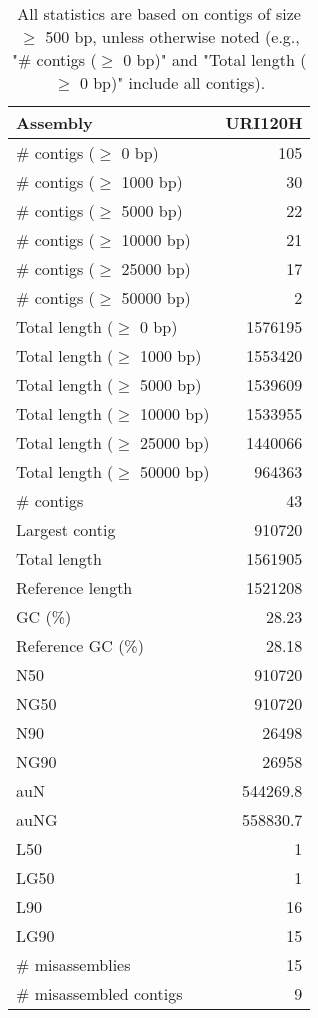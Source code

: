 \documentclass[12pt,a4paper]{article}
\begin{document}
\begin{table}[ht]
\begin{center}
\caption{All statistics are based on contigs of size $\geq$ 500 bp, unless otherwise noted (e.g., "\# contigs ($\geq$ 0 bp)" and "Total length ($\geq$ 0 bp)" include all contigs).}
\begin{tabular}{|l*{1}{|r}|}
\hline
Assembly & URI120H \\ \hline
\# contigs ($\geq$ 0 bp) & 105 \\ \hline
\# contigs ($\geq$ 1000 bp) & 30 \\ \hline
\# contigs ($\geq$ 5000 bp) & 22 \\ \hline
\# contigs ($\geq$ 10000 bp) & 21 \\ \hline
\# contigs ($\geq$ 25000 bp) & 17 \\ \hline
\# contigs ($\geq$ 50000 bp) & 2 \\ \hline
Total length ($\geq$ 0 bp) & 1576195 \\ \hline
Total length ($\geq$ 1000 bp) & 1553420 \\ \hline
Total length ($\geq$ 5000 bp) & 1539609 \\ \hline
Total length ($\geq$ 10000 bp) & 1533955 \\ \hline
Total length ($\geq$ 25000 bp) & 1440066 \\ \hline
Total length ($\geq$ 50000 bp) & 964363 \\ \hline
\# contigs & 43 \\ \hline
Largest contig & 910720 \\ \hline
Total length & 1561905 \\ \hline
Reference length & 1521208 \\ \hline
GC (\%) & 28.23 \\ \hline
Reference GC (\%) & 28.18 \\ \hline
N50 & 910720 \\ \hline
NG50 & 910720 \\ \hline
N90 & 26498 \\ \hline
NG90 & 26958 \\ \hline
auN & 544269.8 \\ \hline
auNG & 558830.7 \\ \hline
L50 & 1 \\ \hline
LG50 & 1 \\ \hline
L90 & 16 \\ \hline
LG90 & 15 \\ \hline
\# misassemblies & 15 \\ \hline
\# misassembled contigs & 9 \\ \hline

\end{tabular}
\end{center}
\end{table}
\end{document}
